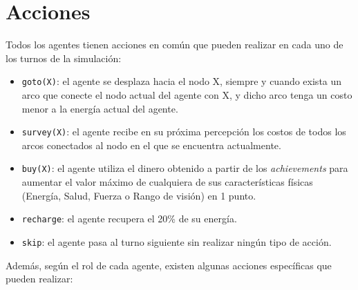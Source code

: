 \section{Acciones}

Todos los agentes tienen acciones en común que pueden realizar en cada uno de los turnos de la simulación:

\begin{itemize}
	\item \texttt{goto(X)}: el agente se desplaza hacia el nodo X, siempre y cuando exista un arco que conecte el nodo actual del agente con X, y dicho arco tenga un costo menor a la energía actual del agente.
	\item \texttt{survey(X)}: el agente recibe en su próxima percepción los costos de todos los arcos conectados al nodo en el que se encuentra actualmente.
	\item \texttt{buy(X)}: el agente utiliza el dinero obtenido a partir de los \textit{achievements} para aumentar el valor máximo de cualquiera de sus características físicas (Energía, Salud, Fuerza o Rango de visión) en 1 punto.
	\item \texttt{recharge}: el agente recupera el 20\% de su energía.
	\item \texttt{skip}: el agente pasa al turno siguiente sin realizar ningún tipo de acción.
\end{itemize}

Además, según el rol de cada agente, existen algunas acciones específicas que pueden realizar:

